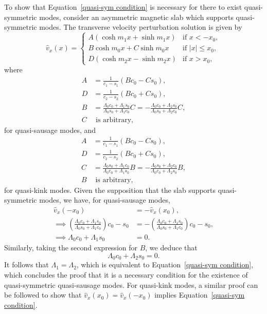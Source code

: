 \documentclass[12pt]{../style-files/ociamthesis}
\begin{document}
To show that Equation~\eqref{quasi-sym condition} is necessary for there to exist quasi-symmetric modes, consider an asymmetric magnetic slab which supports quasi-symmetric modes. The transverse velocity perturbation solution is given by
\begin{equation}
\hat{v}_x(x) =
\begin{cases}
A(\cosh{m_1x} + \sinh{m_1x}) & \text{if } x < -x_0, \\
B\cosh{m_0x} + C\sinh{m_0x} & \text{if } |x| \leq x_0, \\
D(\cosh{m_2x} - \sinh{m_2x}) & \text{if } x > x_0, \label{vsoln}
\end{cases}
\end{equation}
where
\begin{align}
A &= \frac{1}{c_1 - s_1}(Bc_0 - Cs_0), \label{constA C} \\ 
D &= \frac{1}{c_2 - s_2}(Bc_0 + Cs_0), \label{constD C} \\
B &= \frac{\Lambda_0c_0 + \Lambda_1s_0}{\Lambda_0s_0 + \Lambda_1c_0}C = -\frac{\Lambda_0c_0 + \Lambda_2s_0}{\Lambda_0s_0 + \Lambda_2c_0}C, \label{constB C} \\
C & \text{ is arbitrary},
\end{align}
for quasi-sausage modes, and
\begin{align}
A &= \frac{1}{c_1 - s_1}(Bc_0 - Cs_0), \label{constA B} \\ 
D &= \frac{1}{c_2 - s_2}(Bc_0 + Cs_0), \label{constD B} \\
C &= \frac{\Lambda_0s_0 + \Lambda_1c_0}{\Lambda_0c_0 + \Lambda_1s_0}B = -\frac{\Lambda_0s_0 + \Lambda_2c_0}{\Lambda_0c_0 + \Lambda_2s_0}B, \label{constB B} \\
B & \text{ is arbitrary},
\end{align}
for quasi-kink modes. Given the supposition that the slab supports quasi-symmetric modes, we have, for quasi-sausage modes,
\begin{align}
\hat{v}_x(-x_0) &= -\hat{v}_x(x_0), \\
\implies \left(\frac{\Lambda_0c_0 + \Lambda_1s_0}{\Lambda_0s_0 + \Lambda_1c_0}\right) c_0 - s_0 &= -\left(\frac{\Lambda_0c_0 + \Lambda_1s_0}{\Lambda_0s_0 + \Lambda_1c_0}\right)c_0 - s_0, \\
\implies \Lambda_0c_0 + \Lambda_1s_0 &= 0.
\end{align}
Similarly, taking the second expression for $B$, we deduce that 
\begin{equation}
\Lambda_0c_0 + \Lambda_2s_0 = 0.
\end{equation}
It follows that $\Lambda_1 = \Lambda_2$, which is equivalent to Equation~\eqref{quasi-sym condition}, which concludes the proof that it is a necessary condition for the existence of quasi-symmetric quasi-sausage modes. For quasi-kink modes, a similar proof can be followed to show that $\hat{v}_x(x_0) = \hat{v}_x(-x_0)$ implies Equation~\eqref{quasi-sym condition}.
\end{document}
